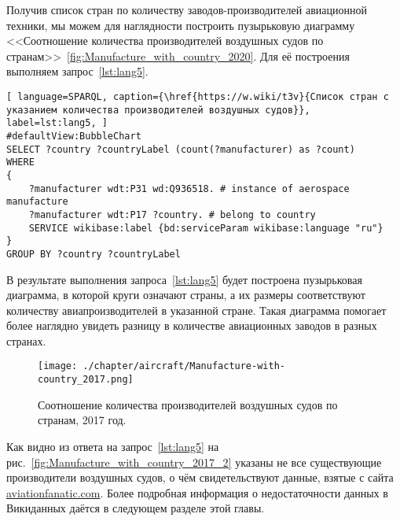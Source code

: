 Получив список стран по количеству заводов-производителей авиационной техники, мы можем для наглядности построить пузырьковую диаграмму <<Соотношение количества
производителей воздушных судов по странам>>~\ref{fig:Manufacture_with_country_2020}. Для её построения выполняем запрос~\ref{lst:lang5}.

\begin{lstlisting}[ language=SPARQL, caption={\href{https://w.wiki/t3v}{Список стран с указанием количества производителей воздушных судов}}, label=lst:lang5, ]
#defaultView:BubbleChart
SELECT ?country ?countryLabel (count(?manufacturer) as ?count)
WHERE
{
    ?manufacturer wdt:P31 wd:Q936518. # instance of aerospace manufacture
  	?manufacturer wdt:P17 ?country. # belong to country
    SERVICE wikibase:label {bd:serviceParam wikibase:language "ru"}
}
GROUP BY ?country ?countryLabel
\end{lstlisting}

В результате выполнения запроса~\ref{lst:lang5} будет построена пузырьковая диаграмма, в которой круги означают страны, а их размеры соответствуют количеству авиапроизводителей в указанной стране. Такая диаграмма помогает более наглядно увидеть разницу в количестве авиационных заводов в разных странах.
 
\begin{figure}[h!]
\centering
	\texttt{[image: ./chapter/aircraft/Manufacture-with-country\_2017.png]}
	\caption{Соотношение количества производителей воздушных судов по странам, 2017 год.}
	\label{fig:Manufacture_with_country_2017}
\end{figure}

\label{aircraft_question_4}

Как видно из ответа на запрос~\ref{lst:lang5} на рис.~\ref{fig:Manufacture_with_country_2017_2} указаны не все существующие производители воздушных судов, о чём свидетельствуют данные, взятые с сайта \href{https://www.aviationfanatic.com/}{aviationfanatic.com}. Более подробная информация о недостаточности данных в Викиданных даётся в следующем разделе этой главы. 

